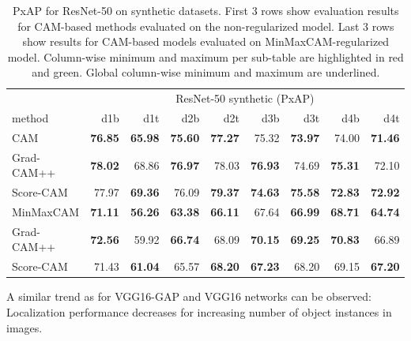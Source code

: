 \begin{table}[H]
\centering
\begin{tabular}{lrrrrrrrr}
\toprule
 & \multicolumn{8}{c}{ResNet-50 synthetic (PxAP)} \\
method & d1b & d1t & d2b & d2t & d3b & d3t & d4b & d4t \\
\cmidrule(lr){1-1} \cmidrule(lr){2-9} 
CAM & \color{purple} \bfseries 76.85 & \color{purple} \bfseries 65.98 & \color{purple} \bfseries 75.60 & \color{purple} \bfseries 77.27 & 75.32 & \color{purple} \bfseries 73.97 & 74.00 & \color{purple} \bfseries 71.46 \\
Grad-CAM++ & \color{teal} \bfseries 78.02 & 68.86 & \color{teal} \bfseries 76.97 & 78.03 & \color{teal} \bfseries 76.93 & 74.69 & \color{teal} \bfseries 75.31 & 72.10 \\
Score-CAM & 77.97 & \color{teal} \bfseries 69.36 & 76.09 & \color{teal} \bfseries 79.37 & \color{purple} \bfseries 74.63 & \color{teal} \bfseries 75.58 & \color{purple} \bfseries 72.83 & \color{teal} \bfseries 72.92 \\
\cmidrule(lr){1-1} \cmidrule(lr){2-9} 
MinMaxCAM & \color{purple} \bfseries 71.11 & \color{purple} \bfseries 56.26 & \color{purple} \bfseries 63.38 & \color{purple} \bfseries 66.11 & 67.64 & \color{purple} \bfseries 66.99 & \color{purple} \bfseries 68.71 & \color{purple} \bfseries 64.74 \\
Grad-CAM++ & \color{teal} \bfseries 72.56 & 59.92 & \color{teal} \bfseries 66.74 & 68.09 & \color{teal} \bfseries 70.15 & \color{teal} \bfseries 69.25 & \color{teal} \bfseries 70.83 & 66.89 \\
Score-CAM & 71.43 & \color{teal} \bfseries 61.04 & 65.57 & \color{teal} \bfseries 68.20 & \color{purple} \bfseries 67.23 & 68.20 & 69.15 & \color{teal} \bfseries 67.20 \\
\bottomrule
\end{tabular}
\caption[PxAP for ResNet-50 on synthetic datasets]{PxAP for ResNet-50 on synthetic datasets. First 3 rows show evaluation results for CAM-based methods evaluated on the non-regularized model. Last 3 rows show results for CAM-based models evaluated on MinMaxCAM-regularized model. Column-wise minimum and maximum per sub-table are highlighted in red and green. Global column-wise minimum and maximum are underlined.}
\label{tab:pxap_resnet50_synthetic}
\end{table}

A similar trend as for VGG16-GAP and VGG16 networks can be observed: Localization performance decreases for increasing number of object instances in images. 

